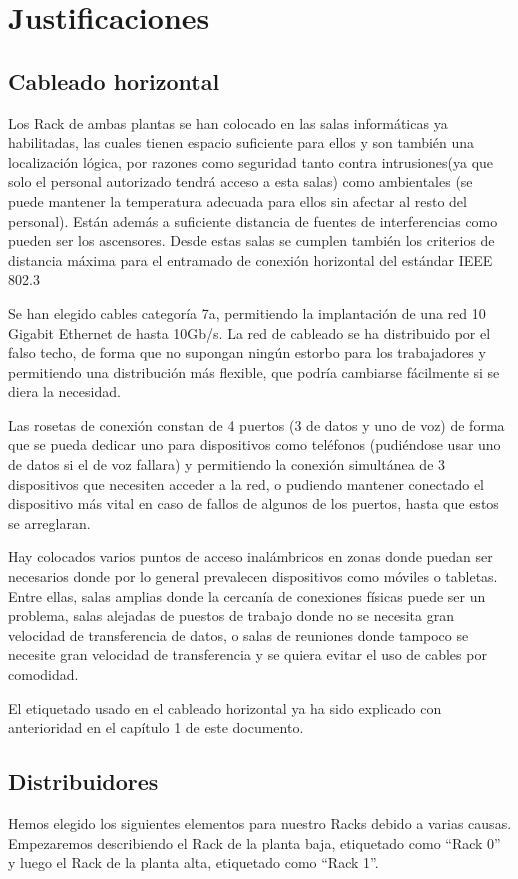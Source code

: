 \chapter{Justificaciones}
\section{Cableado horizontal}
Los Rack de ambas plantas se han colocado en las salas informáticas ya habilitadas, las cuales tienen espacio suficiente para ellos y son también una localización lógica, por razones como seguridad tanto contra intrusiones(ya que solo el personal autorizado tendrá acceso a esta salas) como ambientales (se puede mantener la temperatura adecuada para ellos sin afectar al resto del personal). Están además a suficiente distancia de fuentes de interferencias como pueden ser los ascensores. Desde estas salas se cumplen también los criterios de distancia máxima para el entramado de conexión horizontal del estándar IEEE 802.3

Se han elegido cables categoría 7a, permitiendo la implantación de una red 10 Gigabit Ethernet de hasta 10Gb/s. La red de cableado se ha distribuido por el falso techo, de forma que no supongan ningún estorbo para los trabajadores y permitiendo una distribución más flexible, que podría cambiarse fácilmente si se diera la necesidad.

Las rosetas de conexión constan de 4 puertos (3 de datos y uno de voz) de forma que se pueda dedicar uno para dispositivos como teléfonos (pudiéndose usar uno de datos si el de voz fallara) y permitiendo la conexión simultánea de 3 dispositivos que necesiten acceder a la red, o pudiendo mantener conectado el dispositivo más vital en caso de fallos de algunos de los puertos, hasta que estos se arreglaran.

Hay colocados varios puntos de acceso inalámbricos en zonas donde puedan ser necesarios donde por lo general prevalecen dispositivos como móviles o tabletas. Entre ellas, salas amplias donde la cercanía de conexiones físicas puede ser un problema, salas alejadas de puestos de trabajo donde no se necesita gran velocidad de transferencia de datos, o salas de reuniones donde tampoco se necesite gran velocidad de transferencia y se quiera evitar el uso de cables por comodidad.

El etiquetado usado en el cableado horizontal ya ha sido explicado con anterioridad en el capítulo 1 de este documento.
\section{Distribuidores}
Hemos elegido los siguientes elementos para nuestro Racks debido a varias causas. Empezaremos describiendo el Rack de la planta baja, etiquetado como ``Rack 0'' y luego el Rack de la planta alta, etiquetado como ``Rack 1''.
